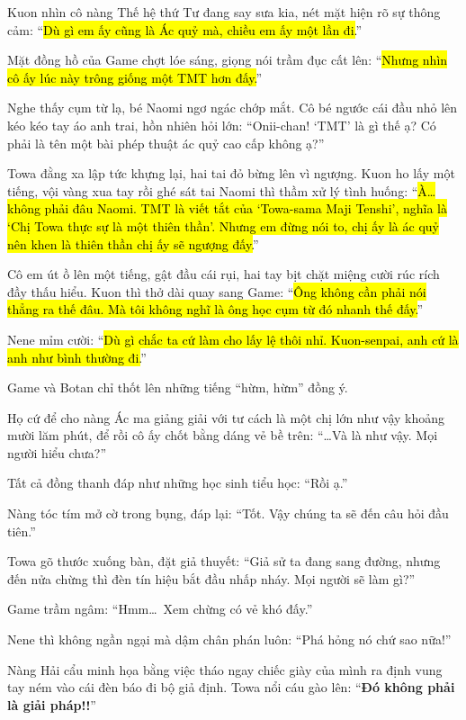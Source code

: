 \documentclass[../main.tex]{subfiles}
\begin{document}
Kuon nhìn cô nàng Thế hệ thứ Tư đang say sưa kia, nét mặt hiện rõ sự thông cảm: ``\hl{Dù gì em ấy cũng là Ác quỷ mà, chiều em ấy một lần đi.}''


Mặt đồng hồ của Game chợt lóe sáng, giọng nói trầm đục cất lên: ``\hl{Nhưng nhìn cô ấy lúc này trông giống một TMT hơn đấy.}''

Nghe thấy cụm từ lạ, bé Naomi ngơ ngác chớp mắt. Cô bé ngước cái đầu nhỏ lên kéo kéo tay áo anh trai, hồn nhiên hỏi lớn: ``Onii-chan! `TMT' là gì thế ạ? Có phải là tên một bài phép thuật ác quỷ cao cấp không ạ?''

Towa đằng xa lập tức khựng lại, hai tai đỏ bừng lên vì ngượng. Kuon ho lấy một tiếng, vội vàng xua tay rồi ghé sát tai Naomi thì thầm xử lý tình huống: ``\hl{À\dots{} không phải đâu Naomi. TMT là viết tắt của `Towa-sama Maji Tenshi', nghĩa là `Chị Towa thực sự là một thiên thần'. Nhưng em đừng nói to, chị ấy là ác quỷ nên khen là thiên thần chị ấy sẽ ngượng đấy.}''

Cô em út ồ lên một tiếng, gật đầu cái rụi, hai tay bịt chặt miệng cười rúc rích đầy thấu hiểu. Kuon thì thở dài quay sang Game: ``\hl{Ông không cần phải nói thẳng ra thế đâu. Mà tôi không nghĩ là ông học cụm từ đó nhanh thế đấy.}''

Nene mỉm cười: ``\hl{Dù gì chắc ta cứ làm cho lấy lệ thôi nhỉ. Kuon-senpai, anh cứ là anh như bình thường đi.}''

Game và Botan chỉ thốt lên những tiếng ``hừm, hừm'' đồng ý.

Họ cứ để cho nàng Ác ma giảng giải với tư cách là một chị lớn như vậy khoảng mười lăm phút, để rồi cô ấy chốt bằng dáng vẻ bề trên: ``\dots Và là như vậy. Mọi người hiểu chưa?''

Tất cả đồng thanh đáp như những học sinh tiểu học: ``Rồi ạ.''

Nàng tóc tím mở cờ trong bụng, đáp lại: ``Tốt. Vậy chúng ta sẽ đến câu hỏi đầu tiên.''

Towa gõ thước xuống bàn, đặt giả thuyết: ``Giả sử ta đang sang đường, nhưng đến nửa chừng thì đèn tín hiệu bắt đầu nhấp nháy. Mọi người sẽ làm gì?''


Game trầm ngâm: ``Hmm\dots\ Xem chừng có vẻ khó đấy.''

Nene thì không ngần ngại mà dậm chân phán luôn: ``Phá hỏng nó chứ sao nữa!''

Nàng Hải cẩu minh họa bằng việc tháo ngay chiếc giày của mình ra định vung tay ném vào cái đèn báo đi bộ giả định. Towa nổi cáu gào lên: ``\textbf{Đó không phải là giải pháp!!}''
\end{document}
